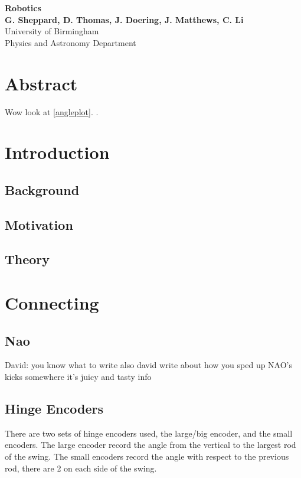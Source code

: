 \documentclass[11pt]{article}
\newcommand*\ruleline[1]{\par\noindent\raisebox{.8ex}{\makebox[\linewidth]{\hrulefill\hspace{1ex}\raisebox{-.8ex}{#1}\hspace{1ex}\hrulefill}}}
\begin{document}
\begin{titlepage}

    \begin{center}
        \vspace*{1cm}
        \Huge
        \textbf{Robotics} \\
        \vspace{0.5cm}
        \LARGE
        \vspace{1.5cm}
        \textbf{G. Sheppard, D. Thomas, J. Doering, J. Matthews, C. Li} \\
        \vfill
        \vspace{0.8cm}
        \Large
        University of Birmingham\\
        Physics and Astronomy Department\\
    \end{center}
\end{titlepage}

\tableofcontents

\section{Abstract}
Wow look at \ref{angleplot}. \cite{Bae2006}.

\section{Introduction}
\subsection{Background}
\subsection{Motivation}
\subsection{Theory}

\section{Connecting}
\subsection{Nao}
David: you know what to write
also david write about how you sped up NAO's kicks somewhere it's juicy and tasty info
\subsection{Hinge Encoders}
\ruleline{George Sheppard}
There are two sets of hinge encoders used, the large/big encoder, and the small encoders. The large encoder record the angle from the vertical to the largest rod of the swing. The small encoders record the angle with respect to the previous rod, there are 2 on each side of the swing.\\
\end{document}
